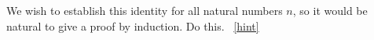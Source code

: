 \documentclass{book}
\begin{document}
\setcounter{project}{77}
\addtocounter{project}{-1}
\begin{activity}[]\label{activity-70}
\hypertarget{p-610}{}%
We wish to establish this identity for all natural numbers \(n\), so it would be natural to give a proof by induction.  Do this.%
~\hfill{\tiny\hyperlink{a-77}{[hint]}\hypertarget{q-77}{}}\end{activity}
\end{document}
